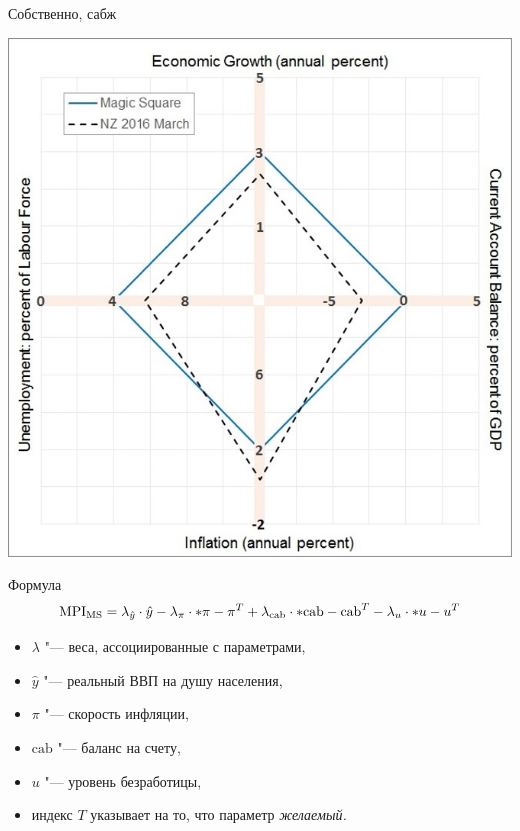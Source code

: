 \documentclass{beamer}
\let\abs\relax
\DeclarePairedDelimiter\abs{\lvert}{\rvert}
\begin{document}
	\begin{frame}{Собственно, сабж}
	
		\begin{center}
			\includegraphics[height = .8\textheight]{ms.jpg}
		\end{center}
		
	\end{frame}
	
	\begin{frame}{Формула}
			\[
				\mathrm{MPI_{MS}} = \lambda_{\hat{y}}\cdot\hat{y} - 
									\lambda_\pi\cdot\abs*{\pi-\pi^T} +
									\lambda_{\mathrm{cab}}\cdot\abs*{{\mathrm{cab}}-{\mathrm{cab}}^T} -
									\lambda_u\cdot\abs*{u-u^T}
			\]
			
			\begin{itemize}
			\item $\lambda$ "--- веса, ассоциированные с параметрами,
			\item $\hat{y}$ "--- реальный ВВП на душу населения,
			\item $\pi$ "--- скорость инфляции,
			\item $\mathrm{cab}$ "--- баланс на счету,
			\item $u$ "--- уровень безработицы,
			\item индекс $T$ указывает на то, что параметр \textit{желаемый.}
			\end{itemize}
			
	\end{frame}
\end{document}

